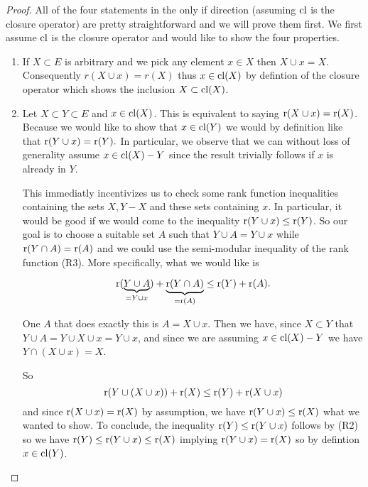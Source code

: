 \begin{proof}
    All of the four statements in the only if direction (assuming $\mathrm{cl}$ is the closure operator) are pretty straightforward and we will prove them first. We first assume $\mathrm{cl}$ is the closure operator and would like to show the four properties.

    \begin{enumerate}
        \item If $X\subset E$ is arbitrary and we pick any element $x \in X$ then $X \cup x = X$. Consequently $r(X \cup x)= r(X)$ thus $x \in \mathrm{cl}(X)$ by defintion of the closure operator which shows the inclusion $X \subset \mathrm{cl}(X)$.

        \item Let $X \subset Y \subset E$
        and $x \in \mathrm{cl}(X)$. This is equivalent to saying $\text{r}(X \cup x) = \text{r}(X)$. Because we would like to show that $x \in \mathrm{cl}(Y)$ we would by definition like that $\text{r}(Y \cup x) = \text{r}(Y).$ In particular, we observe that we can without loss of generality assume $x \in \mathrm{cl}(X) - Y$ since the result trivially follows if $x$ is already in $Y$. 
        
        This immediatly incentivizes us to check some rank function inequalities containing the sets $X, Y - X$ and these sets containing $x.$ In particular, it would be good if we would come to the inequality 
        $\text{r}(Y\cup x) \leq \text{r}(Y)$.
        So our goal is to choose a suitable set $A$ such that $Y \cup A = Y \cup x$ while $\text{r}(Y \cap A) = \text{r}(A)$ and we could use the semi-modular inequality of the rank function (R3). More specifically, what we would like is

        $$\text{r}(\underbrace{Y \cup A}_{ = Y  \cup x}) + \underbrace{\text{r}(Y \cap A)}_{ = \text{r}(A)} \leq \text{r}(Y) + \text{r}(A).$$

        One $A$ that does exactly this is $A = X \cup x.$ Then we have, since $X \subset Y$ that $Y \cup A = Y \cup X \cup x = Y \cup x$, and since we are assuming $x \in \mathrm{cl}(X) - Y$ we have $Y \cap (X \cup x) = X $.

        So $$\text{r}(Y\cup (X \cup x)) + \text{r}(X) \leq \text{r}(Y) + \text{r}(X \cup x)$$ and since $\text{r}(X \cup x) = \text{r}(X)$ by assumption, we have 
        $\text{r}(Y \cup x)\leq \text{r}(X)$ what we wanted to show. To conclude, the inequality $\text{r}(Y) \leq \text{r}(Y \cup x)$ follows by (R2) so we have $\text{r}(Y) \leq \text{r}(Y\cup x) \leq \text{r}(X)$ implying $\text{r}(Y \cup x ) = \text{r}(X)$ so by defintion $x \in \mathrm{cl}(Y)$.


\end{enumerate}
\end{proof}
